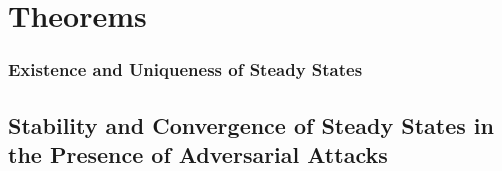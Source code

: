\section{Theorems}\label{sec:theorems}
\subsubsection*{\centering Existence and Uniqueness of Steady States}
% 

\subsection*{Stability and Convergence of Steady States in the Presence of Adversarial Attacks }\label{sec:difference-equation-with-variable-structure}
% 

